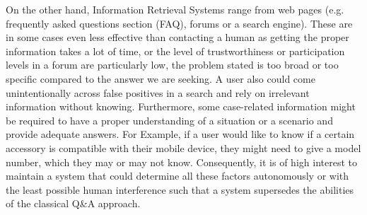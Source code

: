 On the other hand, Information Retrieval Systems range from web pages (e.g. frequently asked questions section (FAQ), forums or a search engine). These are in some cases even less effective than contacting a human as getting the proper information takes a lot of time, or the level of trustworthiness or participation levels in a forum are particularly low, the problem stated is too broad or too specific compared to the answer we are seeking. A user also could come unintentionally across false positives in a search and rely on irrelevant information without knowing.
Furthermore, some case-related information might be required to have a proper understanding of a situation or a scenario and provide adequate answers. For Example, if a user would like to know if a certain accessory is compatible with their mobile device, they might need to give a model number, which they may or may not know.
Consequently, it is of high interest to maintain a system that could determine all these factors autonomously or with the least possible human interference such that a system supersedes the abilities of the classical Q\&A approach.\\

